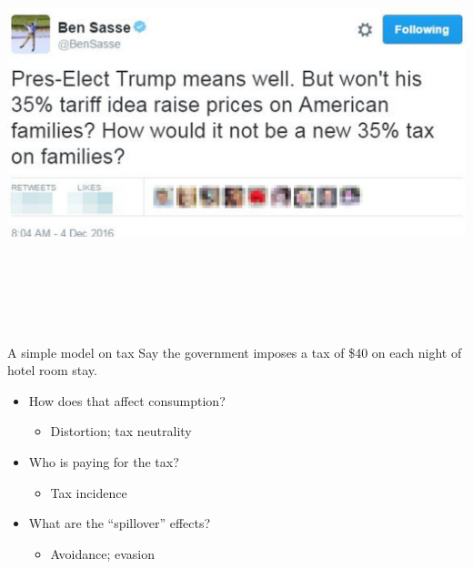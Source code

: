 \documentclass[
  ignorenonframetext,
]{beamer}
\providecommand{\tightlist}{%
  \setlength{\itemsep}{0pt}\setlength{\parskip}{0pt}}
\begin{document}
\begin{frame}{}
\protect\hypertarget{section-5}{}
\includegraphics[width=\textwidth,height=4.6875in]{figures/sasse_tweet.jpeg}
\end{frame}

\begin{frame}{A simple model on tax}
\protect\hypertarget{a-simple-model-on-tax}{}
Say the government imposes a tax of \$40 on each night of hotel room
stay.

\begin{itemize}
\tightlist
\item
  How does that affect consumption?

  \begin{itemize}
  \tightlist
  \item
    Distortion; tax neutrality
  \end{itemize}
\item
  Who is paying for the tax?

  \begin{itemize}
  \tightlist
  \item
    Tax incidence
  \end{itemize}
\item
  What are the ``spillover'' effects?

  \begin{itemize}
  \tightlist
  \item
    Avoidance; evasion
  \end{itemize}
\end{itemize}
\end{frame}
\end{document}
